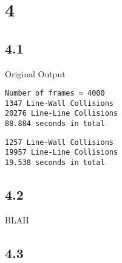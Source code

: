 \documentclass[12pt]{article}
\begin{document}
\maketitle
\section{4}
\subsection{4.1}
Original Output
\begin{verbatim}
Number of frames = 4000
1347 Line-Wall Collisions
20276 Line-Line Collisions
88.884 seconds in total
\end{verbatim}

\begin{verbatim}
1257 Line-Wall Collisions
19957 Line-Line Collisions
19.538 seconds in total
\end{verbatim}
\subsection{4.2}
BLAH

\subsection{4.3}
\end{document}
